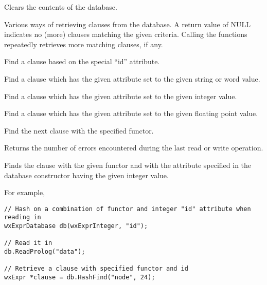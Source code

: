 Clears the contents of the database.

\label{wxexprdatabasefindclause}

Various ways of retrieving clauses from the database. A return
value of NULL indicates no (more) clauses matching the given criteria.
Calling the functions repeatedly retrieves more matching clauses, if any.


Find a clause based on the special ``id'' attribute.


Find a clause which has the given attribute set to the given string or word value.


Find a clause which has the given attribute set to the given integer value.


Find a clause which has the given attribute set to the given floating point value.

\label{wxexprdatabasefindclausebyfunctor}


Find the next clause with the specified functor.

\label{wxexprdatabasegeterrorcount}


Returns the number of errors encountered during the last read or write operation.

\label{wxexprdatabasehashfind}


Finds the clause with the given functor and with the attribute specified
in the database constructor having the given integer value.

For example,

\begin{verbatim}
// Hash on a combination of functor and integer "id" attribute when reading in
wxExprDatabase db(wxExprInteger, "id");

// Read it in
db.ReadProlog("data");

// Retrieve a clause with specified functor and id
wxExpr *clause = db.HashFind("node", 24);
\end{verbatim}

